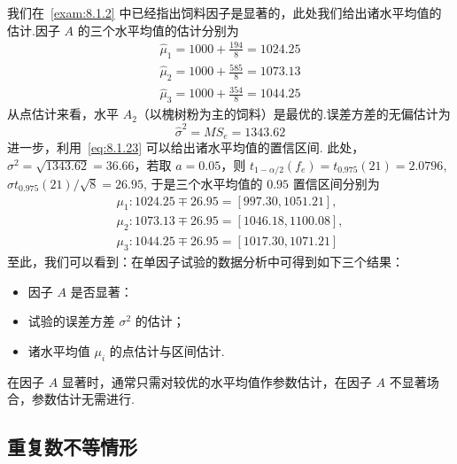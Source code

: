 \begin{example}
我们在~\ref{exam:8.1.2} 中已经指出饲料因子是显著的，此处我们给出诸水平均值的估计.因子 $A$ 的三个水平均值的估计分别为
  \begin{gather*} \hat{\mu}_{1} =1000+\frac{194}{8}=1024.25 \\ 
    \hat{\mu}_{2} =1000+\frac{585}{8}=1073.13 \\ 
    \hat{\mu}_{3} =1000+\frac{354}{8}=1044.25 
  \end{gather*}
从点估计来看，水平 $A_2$（以槐树粉为主的饲料）是最优的.误差方差的无偏估计为
\begin{equation*}
  \hat{\sigma}^{2}=M S_{e}=1343.62
\end{equation*}
进一步，利用~\ref{eq:8.1.23} 可以给出诸水平均值的置信区间. 此处，$\sigma^2=\sqrt{1343.62}=
36.66$，若取 $a=0.05$，则 $t_{1-\alpha/2} (f_e)=t_{0.975}(21)=2.0796$, $\hat{\sigma} t_{0.975}(21)/\sqrt{8}=26.95$, 于是三个水平均值的 $0.95$ 置信区间分别为
\begin{gather*}
  \mu_{1} : 1024.25 \mp 26.95 = [997.30, 1051.21],\\
  \mu_{2} : 1073.13 \mp 26.95=[1046.18,1100.08],\\
  \mu_{3} : 1044.25 \mp 26.95=[1017.30,1071.21]
\end{gather*}
至此，我们可以看到：在单因子试验的数据分析中可得到如下三个结果：
\begin{itemize}
  \item 因子 $A$ 是否显著：
  \item 试验的误差方差 $\sigma^2$ 的估计；
  \item 诸水平均值 $\mu_i$ 的点估计与区间估计.
\end{itemize}

在因子 $A$ 显著时，通常只需对较优的水平均值作参数估计，在因子 $A$ 不显著场合，参数估计无需进行.
\end{example}
\subsection{重复数不等情形}

